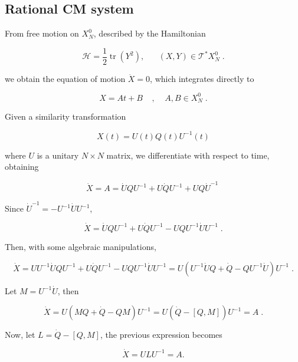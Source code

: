 \subsection{Rational CM system}
From free motion on $X^0_N$, described by the Hamiltonian

\begin{equation}
    \mathcal{H} = \frac{1}{2}\operatorname{tr}(Y^2), \;\;\;\;\;\;(X,Y) \in \mathcal{T}^\ast X^0_N\;.
\end{equation}

we obtain the equation of motion $\ddot X = 0$, which integrates directly to 

\begin{equation}
    X = At + B\;\;\;\;,\;\;\;\;A, B \in X^0_N\;.
\end{equation}

Given a similarity transformation

\begin{equation}
    X(t) = U(t) Q(t) U^{-1}(t)
\end{equation}

where $U$ is a unitary $N \times N$ matrix, we differentiate with respect to time, obtaining

\begin{equation}
    \dot X = A = \dot UQU^{-1} + U \dot Q U^{-1} + UQ \dot U^{-1}\;
\end{equation}

Since $\dot U^{-1} = - U^{-1} \dot U U^{-1}$,

\begin{equation}
    \dot X = \dot UQU^{-1} + U \dot Q U^{-1} -UQU^{-1}\dot U U^{-1}\;.
\end{equation}

Then, with some algebraic manipulations, 

\[\dot X = UU^{-1}\dot UQU^{-1} + U \dot Q U^{-1} -UQU^{-1}\dot U U^{-1} = 
    U(U^{-1} \dot U Q + \dot Q - QU^{-1} \dot U )U^{-1}\;.\]

Let $M = U^{-1}\dot U$, then

\begin{equation}
    \dot X = U(MQ + \dot Q - QM)U^{-1} = U(\dot Q - [Q, M])U^{-1} = A\;.
\end{equation}

Now, let $L = \dot Q - [Q,M]$, the previous expression becomes

\begin{equation}
    \dot X = ULU^{-1} = A.
\end{equation}

